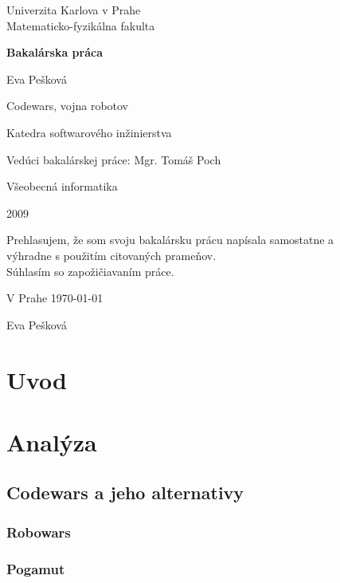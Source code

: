 \documentclass[a4paper,11pt,final]{report}
\begin{document}
\begin{titlepage}
\begin{center}
\vspace{1.5in}
{\rm Univerzita Karlova v Prahe\\
    Matematicko-fyzikálna fakulta}
\par
\vspace{0.7in}
{\huge \bf Bakalárska práca}
\par
\vspace{0.5in}
{Eva Pešková}
\par
\vspace{0.5in}
Codewars, vojna robotov
\par
\vfill
Katedra softwarového inžinierstva
\par
\vspace{0.5in}
Vedúci bakalárskej práce: Mgr. Tomáš Poch
\par
\vspace{0.5in}
Všeobecná informatika
\par
\vspace{0.5in}
2009
\end{center}
\end{titlepage}
\vfill
Prehlasujem, že som svoju bakalársku prácu napísala samostatne a \\
výhradne s použitím citovaných prameňov. \\
Súhlasím so zapožičiavaním práce.\\
\par
V Prahe \today
\begin{flushright}
Eva Pešková
\end{flushright}
\newtheorem{definicia}{Značenie}
\tableofcontents
\chapter{Uvod}%
\chapter{Analýza}

\section{Codewars a jeho alternativy}
\subsection {Robowars}
\subsection {Pogamut}
\end{document}
